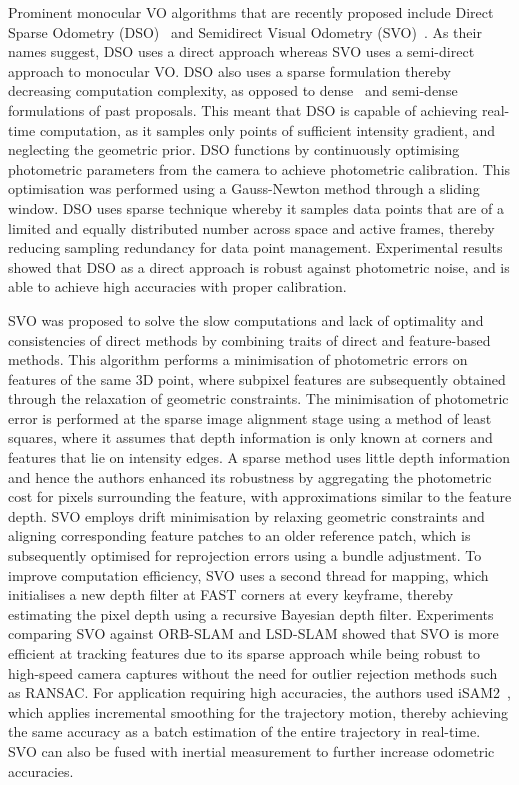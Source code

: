 Prominent monocular VO algorithms that are recently proposed include Direct Sparse Odometry (DSO)~\cite{engel_direct_2018} and Semidirect Visual Odometry (SVO)~\cite{forster_svo:_2017}. As their names suggest, DSO uses a direct approach whereas SVO uses a semi-direct approach to monocular VO. DSO also uses a sparse formulation thereby decreasing computation complexity, as opposed to dense~\cite{newcombe_dtam:_2011, meilland_real-time_2011} and semi-dense~\cite{daftry_semi-dense_2015, engel_lsd-slam:_2014} formulations of past proposals. This meant that DSO is capable of achieving real-time computation, as it samples only points of sufficient intensity gradient, and neglecting the geometric prior. DSO functions by continuously optimising photometric parameters from the camera to achieve photometric calibration. This optimisation was performed using a Gauss-Newton method through a sliding window. DSO uses sparse technique whereby it samples data points that are of a limited and equally distributed number across space and active frames, thereby reducing sampling redundancy for data point management. Experimental results showed that DSO as a direct approach is robust against photometric noise, and is able to achieve high accuracies with proper calibration. 

SVO was proposed to solve the slow computations and lack of optimality and consistencies of direct methods by combining traits of direct and feature-based methods. This algorithm performs a minimisation of photometric errors on features of the same 3D point, where subpixel features are subsequently obtained through the relaxation of geometric constraints. The minimisation of photometric error is performed at the sparse image alignment stage using a method of least squares, where it assumes that depth information is only known at corners and features that lie on intensity edges. A sparse method uses little depth information and hence the authors enhanced its robustness by aggregating the photometric cost for pixels surrounding the feature, with approximations similar to the feature depth. SVO employs drift minimisation by relaxing geometric constraints and aligning corresponding feature patches to an older reference patch, which is subsequently optimised for reprojection errors using a bundle adjustment. To improve computation efficiency, SVO uses a second thread for mapping, which initialises a new depth filter at FAST corners at every keyframe, thereby estimating the pixel depth using a recursive Bayesian depth filter. Experiments comparing SVO against ORB-SLAM and LSD-SLAM showed that SVO is more efficient at tracking features due to its sparse approach while being robust to high-speed camera captures without the need for outlier rejection methods such as RANSAC. For application requiring high accuracies, the authors used iSAM2~\cite{kaess_isam2:_2012}, which applies incremental smoothing for the trajectory motion, thereby achieving the same accuracy as a batch estimation of the entire trajectory in real-time. SVO can also be fused with inertial measurement to further increase odometric accuracies. 

